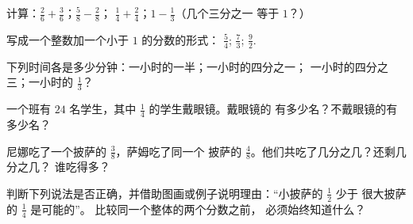 \begin{exercise}[$\star$]\label{exo:g4:fractions:6}
计算：$\frac26 + \frac36$；\quad $\frac58 - \frac28$；\quad
$\frac14 + \frac24$；\quad $1 - \frac13$（几个三分之一
等于 $1$？）
\end{exercise}

\begin{exercise}[$\star$]\label{exo:g4:fractions:7}
写成一个整数加一个小于 $1$ 的分数的形式：
$\frac54$; \quad $\frac73$; \quad $\frac{9}{2}$.
\end{exercise}

\begin{exercise}[$\star$]\label{exo:g4:fractions:8}
下列时间各是多少分钟：一小时的一半；一小时的四分之一；
一小时的四分之三；一小时的 $\frac13$？
\end{exercise}

\begin{exercise}[$\star$]\label{exo:g4:fractions:9}
一个班有 $24$ 名学生，其中 $\frac14$ 的学生戴眼镜。戴眼镜的
有多少名？不戴眼镜的有多少名？
\end{exercise}

\begin{exercise}[$\star\star$]\label{exo:g4:fractions:10}
尼娜吃了一个披萨的 $\frac38$，萨姆吃了同一个
披萨的 $\frac48$。他们共吃了几分之几？还剩几分之几？
谁吃得多？
\end{exercise}

\begin{exercise}[$\star\star$]\label{exo:g4:fractions:11}
判断下列说法是否正确，并借助图画或例子说明理由：“小披萨的 $\frac12$ 少于
很大披萨的 $\frac14$ 是可能的”。
比较同一个整体的两个分数之前，
必须始终知道什么？
\end{exercise}
